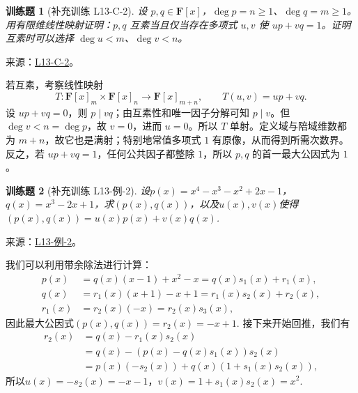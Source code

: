 \documentclass[UTF8,12pt,a4paper,fontset=fandol]{ctexart}
\newtheorem{exercise}{训练题}[section]
\begin{document}
\begin{exercise}[补充训练 L13-C-2]\label{prob:L13-C-2}
设 $p,q\in\mathbf F[x]$，$\deg p=n\ge1$、$\deg q=m\ge1$。用有限维线性映射证明：$p,q$ 互素当且仅当存在多项式 $u,v$ 使 $up+vq=1$。证明互素时可以选择 $\deg u<m$、$\deg v<n$。
\end{exercise}
\noindent 来源：\href{https://github.com/yhwu-is/Linear-Algebra-Left-Undone/blob/new/%E8%AE%B2%E4%B9%89/%E4%B8%93%E9%A2%98/13%20%E5%A4%9A%E9%A1%B9%E5%BC%8F.tex}{L13-C-2}。
\begin{solve}
若互素，考察线性映射
\[T:\mathbf F[x]_m\times\mathbf F[x]_n\longrightarrow\mathbf F[x]_{m+n},\qquad T(u,v)=up+vq.\]
设 $up+vq=0$，则 $p\mid vq$；由互素性和唯一因子分解可知 $p\mid v$。但 $\deg v<n=\deg p$，故 $v=0$，进而 $u=0$。所以 $T$ 单射。定义域与陪域维数都为 $m+n$，故它也是满射；特别地常值多项式 $1$ 有原像，从而得到所需次数界。反之，若 $up+vq=1$，任何公共因子都整除 $1$，所以 $p,q$ 的首一最大公因式为 $1$。
\end{solve}

\begin{exercise}[补充训练 L13-例-2]\label{prob:L13-例-2}
设$p(x)=x^4-x^3-x^2+2x-1$，$q(x)=x^3-2x+1$，求$(p(x),q(x))$，以及$u(x),v(x)$使得$(p(x),q(x))=u(x)p(x)+v(x)q(x)$.
\end{exercise}
\noindent 来源：\href{https://github.com/yhwu-is/Linear-Algebra-Left-Undone/blob/new/%E8%AE%B2%E4%B9%89/%E4%B8%93%E9%A2%98/13%20%E5%A4%9A%E9%A1%B9%E5%BC%8F.tex}{L13-例-2}。
\begin{solve}
我们可以利用带余除法进行计算：
    \begin{align*}
        p(x)   & =q(x)(x-1)+x^2-x=q(x)s_1(x)+r_1(x),   \\
        q(x)   & =r_1(x)(x+1)-x+1=r_1(x)s_2(x)+r_2(x), \\
        r_1(x) & =r_2(x)(-x)=r_2(x)s_3(x),
    \end{align*}
    因此最大公因式$(p(x),q(x))=r_2(x)=-x+1$. 接下来开始回推，我们有
    \begin{align*}
        r_2(x) & =q(x)-r_1(x)s_2(x)                   \\
               & =q(x)-(p(x)-q(x)s_1(x))s_2(x)        \\
               & =p(x)(-s_2(x))+q(x)(1+s_1(x)s_2(x)),
    \end{align*}
    所以$u(x)=-s_2(x)=-x-1$，$v(x)=1+s_1(x)s_2(x)=x^2$.
\end{solve}
\end{document}
